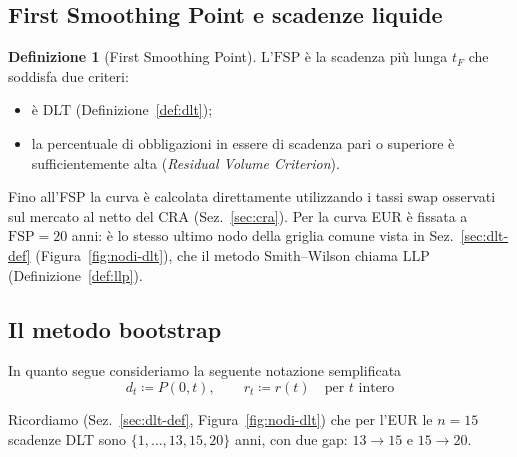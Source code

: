 \documentclass[11pt,a4paper]{article}
\theoremstyle{plain}
\theoremstyle{definition}
\newtheorem{definizione}[teorema]{Definizione}
\theoremstyle{remark}
\newcommand{\FSP}{\mathrm{FSP}}
\newcommand{\defeq}{\coloneqq}
\newcommand{\LLP}{\mathrm{LLP}}
\begin{document}
\subsection{First Smoothing Point e scadenze liquide}
\label{sec:fsp-dlt}

\begin{definizione}[First Smoothing Point]
\label{def:fsp}
L'$\FSP$ \`e la scadenza pi\`u lunga $t_F$ che soddisfa due criteri: \begin{itemize} \item  \`e DLT (Definizione~\ref{def:dlt}); \item  la
percentuale di obbligazioni in essere di scadenza pari o superiore \`e sufficientemente alta
(\emph{Residual Volume Criterion}).
\end{itemize}
Fino all'FSP la curva \`e calcolata direttamente utilizzando i tassi swap osservati sul mercato al netto del CRA (Sez.~\ref{sec:cra}).
Per la curva EUR è fissata a $\FSP=20$ anni: \`e lo stesso ultimo nodo della griglia comune
vista in Sez.~\ref{sec:dlt-def} (Figura~\ref{fig:nodi-dlt}), che il metodo Smith--Wilson
chiama $\LLP$ (Definizione~\ref{def:llp}).
\end{definizione}


\subsection{Il metodo bootstrap}
\label{sec:bootstrap}

In quanto segue consideriamo la seguente notazione semplificata
\[
  d_t \defeq P(0,t), \qquad r_t \defeq r(t) \quad\text{per } t \text{ intero}
\]

Ricordiamo (Sez.~\ref{sec:dlt-def}, Figura~\ref{fig:nodi-dlt}) che per l'EUR le $n=15$
scadenze DLT sono $\{1,\dots,13,15,20\}$ anni, con due gap: $13\to15$ e $15\to20$.
\end{document}
